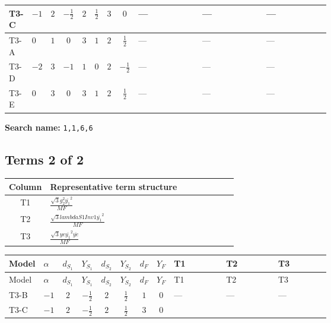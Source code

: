 \documentclass[8pt]{article}
\begin{document}
\begin{landscape}
\begin{longtable}{@{}llcccccc >{\raggedright\arraybackslash}p{0.21\linewidth} >{\raggedright\arraybackslash}p{0.21\linewidth} >{\raggedright\arraybackslash}p{0.21\linewidth}@{}}
\midrule
T3-C & $-1$ & $2$ & $-\frac{1}{2}$ & $2$ & $\frac{1}{2}$ & $3$ & $0$ & --- & --- & --- \\
\midrule
T3-A & $0$ & $1$ & $0$ & $3$ & $1$ & $2$ & $\frac{1}{2}$ & --- & --- & --- \\
\midrule
T3-D & $-2$ & $3$ & $-1$ & $1$ & $0$ & $2$ & $-\frac{1}{2}$ & --- & --- & --- \\
\midrule
T3-E & $0$ & $3$ & $0$ & $3$ & $1$ & $2$ & $\frac{1}{2}$ & --- & --- & --- \\
\midrule
\bottomrule
\end{longtable}
\clearpage
\noindent\textbf{Search name: }\texttt{1,1,6,6}\par\smallskip
\subsection*{Terms 2 of 2}
\begin{center}
\begin{tabular}{@{}c >{\raggedright\arraybackslash}p{0.82\linewidth}@{}}
\toprule
Column & Representative term structure \\
\midrule
T1 & \(\displaystyle \frac{\sqrt{3} g_{2}^{2} \overline{y_{1}}^{2}}{MF}\) \\
\midrule
T2 & \(\displaystyle \frac{\sqrt{3} lambdaS1Inv1 \overline{y_{1}}^{2}}{MF}\) \\
\midrule
T3 & \(\displaystyle \frac{\sqrt{3} ye \overline{y_{1}}^{2} \overline{ye}}{MF}\) \\
\midrule
\bottomrule
\end{tabular}
\end{center}
\smallskip
\tiny
\begin{longtable}{@{}llcccccc >{\raggedright\arraybackslash}p{0.21\linewidth} >{\raggedright\arraybackslash}p{0.21\linewidth} >{\raggedright\arraybackslash}p{0.21\linewidth}@{}}
\toprule
Model & $\alpha$ & $d_{S_1}$ & $Y_{S_1}$ & $d_{S_2}$ & $Y_{S_2}$ & $d_F$ & $Y_F$ & T1 & T2 & T3 \\
\midrule
\endfirsthead
\toprule
Model & $\alpha$ & $d_{S_1}$ & $Y_{S_1}$ & $d_{S_2}$ & $Y_{S_2}$ & $d_F$ & $Y_F$ & T1 & T2 & T3 \\
\midrule
\endhead
T3-B & $-1$ & $2$ & $-\frac{1}{2}$ & $2$ & $\frac{1}{2}$ & $1$ & $0$ & --- & --- & --- \\
\midrule
T3-C & $-1$ & $2$ & $-\frac{1}{2}$ & $2$ & $\frac{1}{2}$ & $3$ & $0$ & \scriptsize\adjustbox{max width=\linewidth}{$\begin{gathered} \frac{\sqrt{3} g_{2}^{2} \overline{y_{1}}^{2}}{4 MF}\end{gathered}$} & \scriptsize\adjustbox{max width=\linewidth}{$\begin{gathered} \frac{\sqrt{3} lambdaS1Inv1 \overline{y_{1}}^{2}}{6 MF}\end{gathered}$} & \scriptsize\adjustbox{max width=\linewidth}{$\begin{gathered} - \frac{\sqrt{3} ye \overline{y_{1}}^{2} \overline{ye}}{12 MF}\end{gathered}$} \\

\end{longtable}
\end{landscape}
\end{document}
